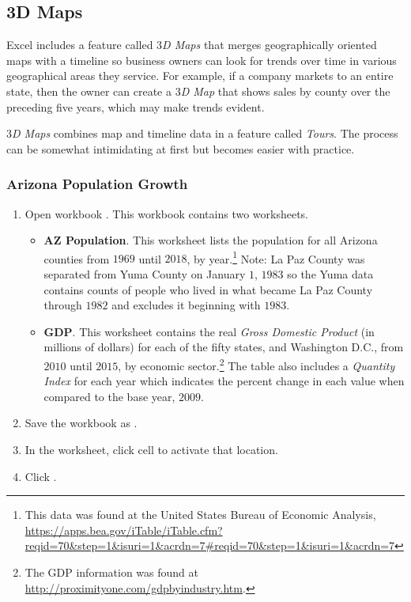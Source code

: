\subsection{3D Maps}

Excel includes a feature called \textit{$ 3 $D Maps} that merges geographically oriented maps with a timeline so business owners can look for trends over time in various geographical areas they service. For example, if a company markets to an entire state, then the owner can create a \textit{$ 3 $D Map} that shows sales by county over the preceding five years, which may make trends evident.

\textit{$ 3 $D Maps} combines map and timeline data in a feature called \textit{Tours}. The process can be somewhat intimidating at first but becomes easier with practice.

\subsubsection{Arizona Population Growth}

\begin{enumbox}
	\begin{enumerate}
		\item Open workbook . This workbook contains two worksheets.	
		\begin{itemize}
			\item \textbf{AZ Population}. This worksheet lists the population for all Arizona counties from $ 1969 $ until $ 2018 $, by year.\footnote{This data was found at the United States Bureau of Economic Analysis, \url{https://apps.bea.gov/iTable/iTable.cfm?reqid=70&step=1&isuri=1&acrdn=7\#reqid=70&step=1&isuri=1&acrdn=7}} Note: La Paz County was separated from Yuma County on January $ 1 $, $ 1983 $ so the Yuma data contains counts of people who lived in what became La Paz County through $ 1982 $ and excludes it beginning with $ 1983 $.
			\item \textbf{GDP}. This worksheet contains the real \textit{Gross Domestic Product} (in millions of dollars) for each of the fifty states, and Washington D.C., from $ 2010 $ until $ 2015 $, by economic sector.\footnote{The GDP information was found at \url{http://proximityone.com/gdpbyindustry.htm}.} The table also includes a \textit{Quantity Index} for each year which indicates the percent change in each value when compared to the base year, $ 2009 $.
		\end{itemize}
		\item Save the workbook as .
		\item In the  worksheet, click cell  to activate that location.
		\item Click .
	\end{enumerate}
\end{enumbox}

